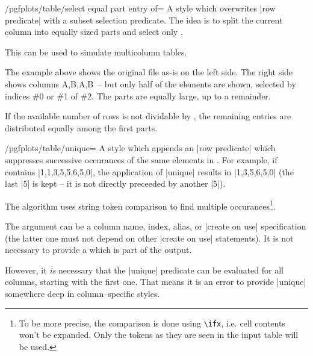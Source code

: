 \begin{stylekey}{/pgfplots/table/select equal part entry of=}
	A style which overwrites |row predicate| with a subset selection predicate. The idea is to split the current column into  equally sized parts and select only .

	This can be used to simulate multicolumn tables.
\begin{codeexample}[]


\end{codeexample}
	The example above shows the original file as-is on the left side. The right side shows columns A,B,A,B~-- but only half of the elements are shown, selected by indices \#0 or \#1 of \#2. The parts are equally large, up to a remainder. 
	
	If the available number of rows is not dividable by , the remaining entries are distributed equally among the first parts.
\end{stylekey}

\begin{stylekey}{/pgfplots/table/unique=}
	A style which appends an |row predicate| which suppresses successive occurances of the same elements in .
	For example, if  contains |1,1,3,5,5,6,5,0|, the application of |unique| results in |1,3,5,6,5,0| (the last |5| is kept -- it is not directly preceeded by another |5|).

	The algorithm uses string token comparison to find multiple occurances\footnote{To be more precise, the comparison is done using \texttt{\textbackslash ifx}, i.e. cell contents won't be expanded. Only the tokens as they are seen in the input table will be used.}.

	The argument  can be a column name, index, alias, or |create on use| specification (the latter one must not depend on other |create on use| statements). It is not necessary to provide a  which is part of the output.

	However, it \emph{is} necessary that the |unique| predicate can be evaluated for all columns, starting with the first one. That means it is an error to provide |unique| somewhere deep in column--specific styles.
\end{stylekey}

